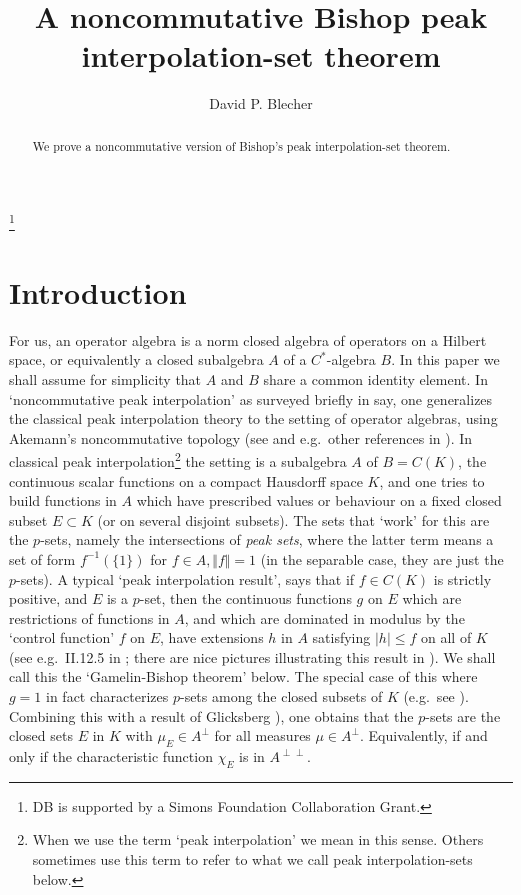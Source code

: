 \documentclass{amsart}
\theoremstyle{remark}
\theoremstyle{definition}
\numberwithin{equation}{section}
\begin{document}
\title{A noncommutative  Bishop peak interpolation-set theorem}
\author{David P. Blecher}
\address{Department of Mathematics, University of Houston, Houston, TX
77204-3008, USA}

\thanks{DB  is supported by a Simons Foundation Collaboration Grant.  }

\begin{abstract}  We prove a noncommutative version of  Bishop's peak interpolation-set theorem.  \end{abstract}

\maketitle

\section{Introduction}

For us, an operator algebra is a norm closed algebra of operators on a Hilbert space, or equivalently a closed subalgebra $A$ of a $C^*$-algebra $B$.
In this paper we shall assume for simplicity that $A$ and $B$ share a common identity element. 
In `noncommutative peak interpolation' as surveyed briefly in \cite{Bnpi} say, one generalizes the classical peak interpolation theory to the setting of
operator algebras, using Akemann's noncommutative topology (see \cite{Ake2} and e.g.\ other references  in \cite{Bnpi}).
In classical peak 
interpolation\footnote{When we use the term `peak interpolation' we mean in this sense.  Others sometimes use this term to refer to what we call peak interpolation-sets below.}
 the setting is a subalgebra $A$ of $B = C(K)$, the continuous scalar functions on a compact Hausdorff space $K$, and one tries to build
functions in $A$ which have prescribed values or behaviour on a fixed closed subset $E \subset K$ (or on 
several disjoint subsets).   The sets that  `work' for this are the $p$-sets, namely the  intersections of {\em peak sets}, where the latter term means a 
set of form $f^{-1}(\{ 1 \})$ for $f \in A, \Vert f \Vert = 1$ (in the separable case, they are just the $p$-sets).   
A typical `peak interpolation result',
says that if $f
\in C(K)$ is strictly positive, and $E$ is a $p$-set, then the continuous functions  $g$ on $E$  which are restrictions of 
functions in $A$, and which are dominated in modulus 
by the `control function' $f$ on $E$, have extensions $h$ in $A$ satisfying $|h| \leq f$ on 
all of $K$ (see 
 e.g.\ II.12.5 in \cite{Gam}; there are nice pictures illustrating this result in \cite{Bnpi}).    We shall call this the `Gamelin-Bishop theorem' below.   
 The special case of this where $g = 1$ in fact characterizes $p$-sets among the closed subsets of 
$K$ (e.g.\ see \cite{Gamr}).    Combining this with a result of Glicksberg \cite[Theorem II.12.7]{Gam}), one obtains that the $p$-sets are the closed sets $E$ in  
$K$ with $\mu_E \in A^\perp$ for all measures $\mu \in A^\perp$.   Equivalently, if and only if the characteristic function $\chi_E$ is in $A^{\perp \perp}$.
\end{document}
